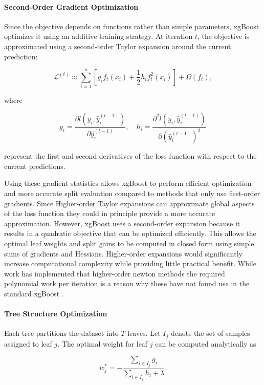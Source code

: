 \paragraph{Second-Order Gradient Optimization}

Since the objective depends on functions rather than simple parameters, \gls{xgBoost} optimizes it using an additive training strategy. At iteration $t$, the objective is approximated using a second-order Taylor expansion around the current prediction:

\[
\mathcal{L}^{(t)} \approx
\sum_{i=1}^{n}
\left[
g_i f_t(x_i)
+
\frac{1}{2} h_i f_t^2(x_i)
\right]
+
\Omega(f_t),
\]

where

\[
g_i = \frac{\partial l(y_i,\hat{y}_i^{(t-1)})}{\partial \hat{y}_i^{(t-1)}},
\quad
h_i = \frac{\partial^2 l(y_i,\hat{y}_i^{(t-1)})}{\partial (\hat{y}_i^{(t-1)})^2}
\]

represent the first and second derivatives of the loss function with respect to the current predictions.

Using these gradient statistics allows \gls{xgBoost} to perform efficient optimization and more accurate split evaluation compared to methods that only use first-order gradients. Since Higher-order Taylor expansions can approximate global aspects of the loss function they could in principle provide a more accurate approximation. However, \gls{xgBoost} uses a second-order expansion because it results in a quadratic objective that can be optimized efficiently. This allows the optimal leaf weights and split gains to be computed in closed form using simple sums of gradients and Hessians. Higher-order expansions would significantly increase computational complexity while providing little practical benefit. While work has implemented that higher-order newton methods the required polynomial work per iteration is a reason why these have not found use in the standard \gls{xgBoost} \citep{Ahmadi2024}. 

\paragraph{Tree Structure Optimization}

Each tree partitions the dataset into $T$ leaves. Let $I_j$ denote the set of samples assigned to leaf $j$. The optimal weight for leaf $j$ can be computed analytically as

\[
w_j^* =
-\frac{\sum_{i \in I_j} g_i}
{\sum_{i \in I_j} h_i + \lambda}.
\]

